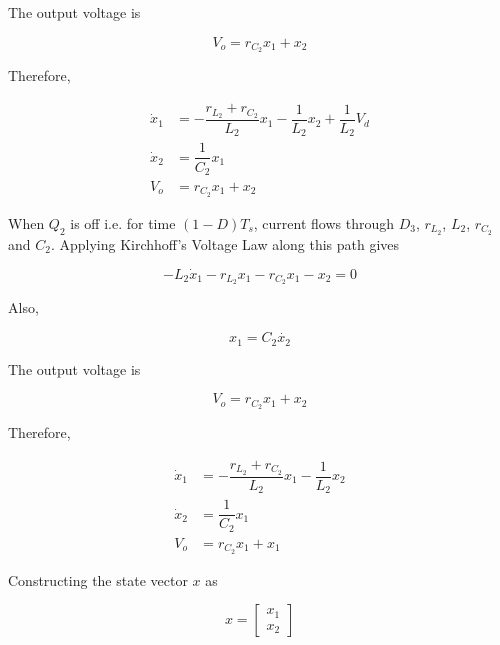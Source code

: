 \documentclass[a4paper]{IEEEtran}
\begin{document}
	The output voltage is

	\begin{equation}
		V_o = r_{C_2}x_1 + x_2
		\label{eq:mod3}
	\end{equation}

	Therefore,

	\begin{equation}
		\begin{split}
		\dot{x}_1 &= -\dfrac{r_{L_2}+r_{C_2}}{L_2}x_1 -\dfrac{1}{L_2}x_2+\dfrac{1}{L_2}V_d\\
		\dot{x}_2 &= \dfrac{1}{C_2}x_1\\
		V_o &= r_{C_2}x_1 + x_2
		\end{split}
		\label{eq:mod4}
	\end{equation}

	When $Q_2$ is off i.e. for time $(1-D)T_s$, current flows through  $D_3$, $r_{L_2}$, $L_2$, $r_{C_2}$ and $C_2$. Applying Kirchhoff's Voltage Law along this path gives

	\begin{equation}
		- L_2 \dot{x}_1 - r_{L_2}x_1 - r_{C_2}x_1-x_2 = 0
		\label{eq:mod5}
	\end{equation}

	Also,

	\begin{equation}
		x_1 = C_2\dot{x_2} 
		\label{eq:mod6}
	\end{equation}
	
	The output voltage is

	\begin{equation}
		V_o = r_{C_2}x_1 + x_2
		\label{eq:mod7}
	\end{equation}

	Therefore,

	\begin{equation}
		\begin{split}
			\dot{x}_1 &= -\dfrac{r_{L_2}+r_{C_2}}{L_2}x_1 -\dfrac{1}{L_2}x_2\\
			\dot{x}_2 &= \dfrac{1}{C_2}x_1\\
			V_o &= r_{C_2}x_1 + x_1
		\end{split}
		\label{eq:mod8}
	\end{equation}

	Constructing the state vector $x$ as

	\begin{equation}
		x =
		\begin{bmatrix}
			x_1\\x_2
		\end{bmatrix}
		\label{eq:mod9}
	\end{equation}
\end{document}
